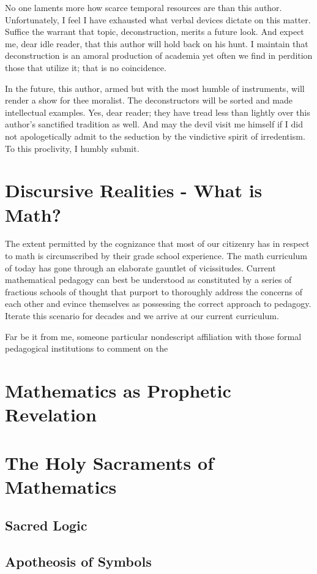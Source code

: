 \documentclass[ms,a4paper]{memoir}
\begin{document}
	No one laments more how scarce temporal resources are than this author. Unfortunately, I feel I have exhausted what verbal devices dictate on this matter. Suffice the warrant that topic, deconstruction, merits a future look. And expect me, dear idle reader, that this author will hold back on his hunt. I maintain that deconstruction is an amoral production of academia yet often we find in perdition those that utilize it; that is no coincidence.
	
	In the future, this author, armed but with the most humble of instruments, will render a show for thee moralist. The deconstructors will be sorted and made intellectual examples. Yes, dear reader; they have tread less than lightly over this author's sanctified tradition as well. And may the devil visit me himself if I did not apologetically admit to the seduction by the vindictive spirit of irredentism. To this proclivity, I humbly submit.
	
	
	\chapter{Discursive Realities - What is Math?}
	The extent permitted by the cognizance that most of our citizenry has in respect to math is circumscribed by their grade school experience. The math curriculum of today has gone through an elaborate gauntlet of vicissitudes. Current mathematical pedagogy can best be understood as constituted by a series of fractious schools of thought that purport to thoroughly address the concerns of each other and evince themselves as possessing the correct approach to pedagogy. Iterate this scenario for decades and we arrive at our current curriculum.
	
	Far be it from me, someone particular nondescript affiliation with those formal pedagogical institutions to comment on the 
	
	
	\chapter{Mathematics as Prophetic Revelation}
	
	\chapter{The Holy Sacraments of Mathematics}
	\section{Sacred Logic}
	\section{Apotheosis of Symbols}
\end{document}
